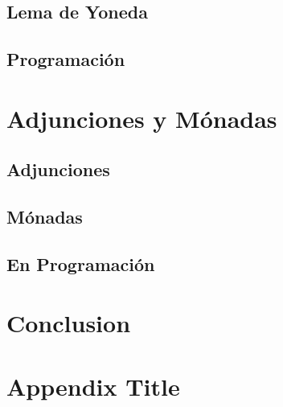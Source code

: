 \documentclass[12pt]{book}
\begin{document}
\section{Lema de Yoneda}

\section{Programación}

\chapter{Adjunciones y Mónadas}
\section{Adjunciones}


\section{Mónadas}


\section{En Programación}


\chapter{Conclusion}

\printbibliography

\appendix
\chapter{Appendix Title}
\end{document}
